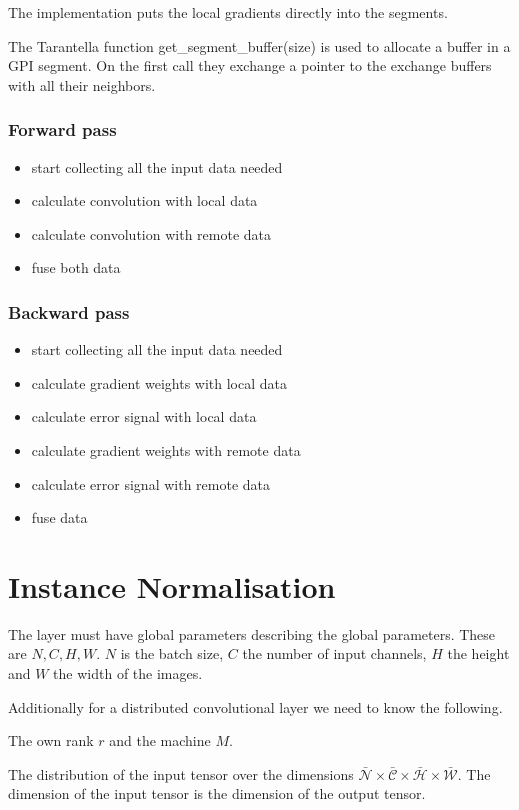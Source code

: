 \documentclass{report}
\begin{document}
The implementation puts the local gradients directly into the segments.

The Tarantella function get\_segment\_buffer(size) is used to allocate a
buffer in a GPI segment. On the first call they exchange a pointer to
the exchange buffers with all their neighbors.

\subsection{Forward pass}
\begin{itemize}
\item
  start collecting all the input data needed
\item
  calculate convolution with local data
\item
  calculate convolution with remote data
\item
  fuse both data
\end{itemize}

\subsection{Backward pass}
\begin{itemize}
\item
  start collecting all the input data needed
\item
  calculate gradient weights with local data
\item
  calculate error signal with local data
\item
  calculate gradient weights with remote data
\item
  calculate error signal with remote data
\item
  fuse data
\end{itemize}

\chapter{Instance Normalisation}

The layer must have global parameters describing the global parameters.
These are $N, C, H, W$. $N$ is the batch size, $C$ the number of input
channels, $H$ the height and
$W$ the width of the images.

Additionally for a distributed convolutional layer we need to know the
following.

The own rank $r$ and the machine $M$.

The distribution of the input tensor over the dimensions
$\bar{\mathcal{N}} \times \bar{\mathcal{C}} \times \bar{\mathcal{H}} \times
\bar{\mathcal{W}}$. The dimension of the input tensor is the dimension
of the output tensor.
\end{document}
